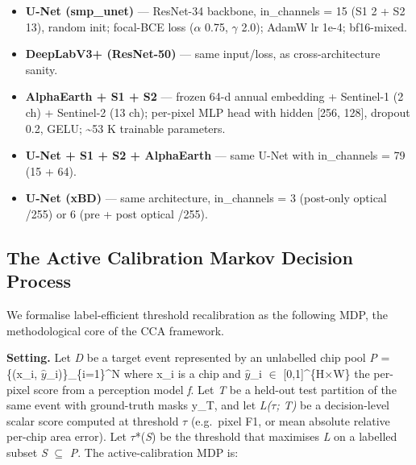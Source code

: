 \documentclass[sn-nature,lineno]{sn-jnl}
\providecommand{\tightlist}{\setlength{\itemsep}{0pt}\setlength{\parskip}{0pt}}
\theoremstyle{thmstyleone}
\theoremstyle{thmstyletwo}
\theoremstyle{thmstylethree}
\begin{document}
\begin{itemize}
\tightlist
\item
  \textbf{U-Net (smp\_unet)} \cite{ronneberger2015unet} --- ResNet-34 backbone, in\_channels = 15 (S1 2 + S2 13),
  random init; focal-BCE loss ($\alpha$ 0.75, $\gamma$ 2.0); AdamW lr 1e-4; bf16-mixed.
\item
  \textbf{DeepLabV3+ (ResNet-50)} --- same input/loss, as cross-architecture sanity.
\item
  \textbf{AlphaEarth + S1 + S2} --- frozen 64-d annual embedding + Sentinel-1 (2 ch) +
  Sentinel-2 (13 ch); per-pixel MLP head with hidden {[}256, 128{]}, dropout 0.2,
  GELU; \textasciitilde53 K trainable parameters.
\item
  \textbf{U-Net + S1 + S2 + AlphaEarth} --- same U-Net with in\_channels = 79 (15 + 64).
\item
  \textbf{U-Net (xBD)} --- same architecture, in\_channels = 3 (post-only optical /255)
  or 6 (pre + post optical /255).
\end{itemize}

\subsection{The Active Calibration Markov Decision Process}\label{the-active-calibration-markov-decision-process}

We formalise label-efficient threshold recalibration as the following MDP,
the methodological core of the CCA framework.

\textbf{Setting.} Let \emph{D} be a target event represented by an unlabelled chip pool
\emph{P} = \{(x\_i, \(\hat{y}\)\_i)\}\_\{i=1\}\^{}N where x\_i is a chip and \(\hat{y}\)\_i $\in$ {[}0,1{]}\^{}\{H$\times$W\} the
per-pixel score from a perception model \emph{f}. Let \emph{T} be a held-out test
partition of the same event with ground-truth masks y\_T, and let \emph{L($\tau$; T)} be
a decision-level scalar score computed at threshold $\tau$ (e.g.~pixel F1, or
mean absolute relative per-chip area error). Let \emph{$\tau$}*(\emph{S}) be the threshold
that maximises \emph{L} on a labelled subset \emph{S} $\subseteq$ \emph{P}. The active-calibration
MDP is:
\end{document}
